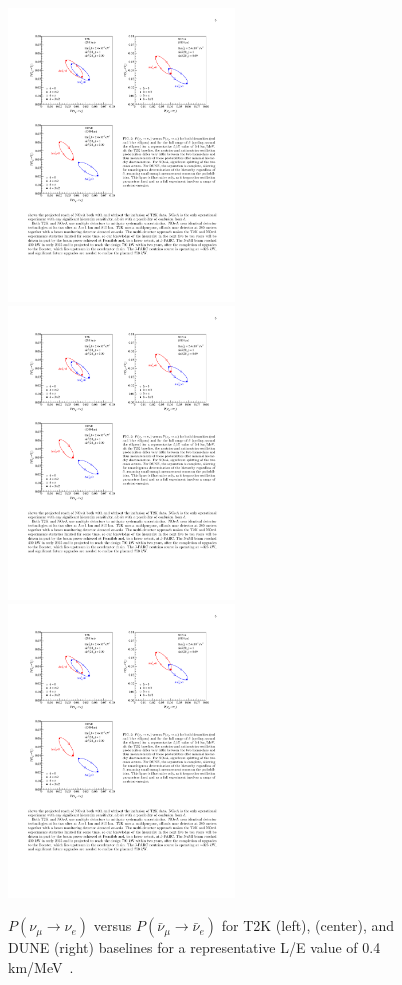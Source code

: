 \begin{figure} [htbp!]
\begin{center}
\includegraphics[width=6cm]{figures/t2k_ellipse.pdf}
\includegraphics[width=6cm]{figures/nova_ellipse.pdf}
\includegraphics[width=6cm]{figures/dune_ellipse.pdf}
\caption{\label{fig:novaellipse} $ P (\nu_\mu \rightarrow \nu_e)$ versus  $ P (\bar{\nu}_\mu \rightarrow \bar{\nu}_e)$ for T2K (left), \nova (center), and DUNE (right) baselines for a representative L/E value of 0.4 km/MeV~\cite{Patterson:2015xja}.}
\end{center}
\label{fig:biprob}
\end{figure}

